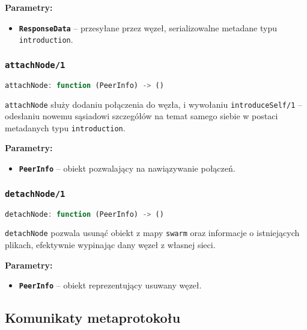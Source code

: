 \textbf{Parametry:}
\begin{itemize}
    \item \textbf{\texttt{ResponseData}} -- przesyłane przez węzeł, serializowalne metadane typu \texttt{introduction}.
\end{itemize}

% 

\subsubsection{\texttt{attachNode/1}}
\begin{lstlisting}[language=javascript]
    attachNode: function (PeerInfo) -> ()
\end{lstlisting}
\texttt{attachNode} służy dodaniu połączenia do węzła, i wywołaniu \texttt{introduceSelf/1} -- odesłaniu nowemu sąsiadowi szczegółów na temat samego siebie w postaci metadanych typu \texttt{introduction}.

\textbf{Parametry:}
\begin{itemize}
    \item \textbf{\texttt{PeerInfo}} -- obiekt pozwalający na nawiązywanie połączeń.
\end{itemize}

% 
\newpage
\subsubsection{\texttt{detachNode/1}}
\begin{lstlisting}[language=javascript]
    detachNode: function (PeerInfo) -> ()
\end{lstlisting}
\texttt{detachNode} pozwala usunąć obiekt z mapy \texttt{swarm} oraz informacje o istniejących plikach, efektywnie wypinając dany węzeł z własnej sieci.

\textbf{Parametry:}
\begin{itemize}
    \item \textbf{\texttt{PeerInfo}} -- obiekt reprezentujący usuwany węzeł.
\end{itemize}

% 

\subsection{Komunikaty metaprotokołu}
\label{sub:metaprotocolMessages}

